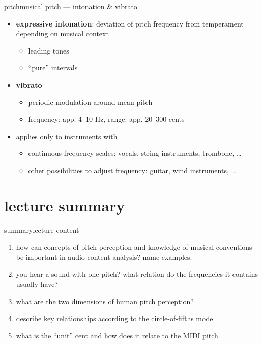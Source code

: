         \begin{frame}{pitch}{musical pitch --- intonation \& vibrato}
            \begin{itemize}
                \item	\textbf{expressive intonation}: deviation of pitch frequency from temperament depending on musical context
                        \begin{itemize}
                            \item	leading tones
                            \item	``pure'' intervals
                        \end{itemize}

                \item<2->	\textbf{vibrato}
                        \begin{itemize}
                            \item	periodic modulation around mean pitch
                            \pause
                            \item 	frequency: app. 4--10 \unit{Hz}, range: app. 20--300 \unit{cents}	
                        \end{itemize}
                \bigskip
                \item<3-> applies only to instruments with
                    \begin{itemize}
                        \item<4->   continuous frequency scales: vocals, string instruments, trombone, \ldots
                        \item<5->   other possibilities to adjust frequency: guitar, wind instruments, \ldots
                    \end{itemize}
            \end{itemize}
        \end{frame}
            
   \section[summary]{lecture summary}
        \begin{frame}{summary}{lecture content}
            \begin{enumerate}
                \item   how can concepts of pitch perception and knowledge of musical conventions be important in audio content analysis? name examples.
                \smallskip
                \item<2->   you hear a sound with one pitch? what relation do the frequencies it contains usually have?
                \smallskip
                \item<3->   what are the two dimensions of human pitch perception?
                \smallskip
                \item<4->   describe key relationships according to the circle-of-fifths model
                \smallskip
                \item<5->   what is the ``unit'' cent and how does it relate to the MIDI pitch 
            \end{enumerate}
        \end{frame}


